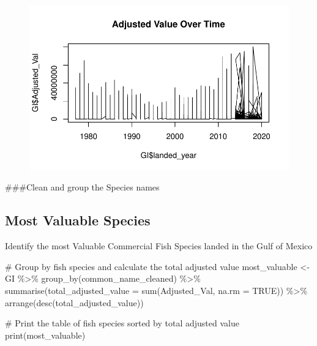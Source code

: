 \documentclass[
  letterpaper,
  DIV=11,
  numbers=noendperiod]{scrartcl}
\newenvironment{Shaded}{\begin{snugshade}}{\end{snugshade}}
\newcommand{\AttributeTok}[1]{\textcolor[rgb]{0.40,0.45,0.13}{#1}}
\newcommand{\CommentTok}[1]{\textcolor[rgb]{0.37,0.37,0.37}{#1}}
\newcommand{\ConstantTok}[1]{\textcolor[rgb]{0.56,0.35,0.01}{#1}}
\newcommand{\FunctionTok}[1]{\textcolor[rgb]{0.28,0.35,0.67}{#1}}
\newcommand{\NormalTok}[1]{\textcolor[rgb]{0.00,0.23,0.31}{#1}}
\newcommand{\OtherTok}[1]{\textcolor[rgb]{0.00,0.23,0.31}{#1}}
\newcommand{\SpecialCharTok}[1]{\textcolor[rgb]{0.37,0.37,0.37}{#1}}
\begin{document}
\begin{figure}[H]

{\centering \includegraphics{CV_Communities2_files/figure-pdf/unnamed-chunk-2-1.pdf}

}

\end{figure}

\#\#\#Clean and group the Species names

\hypertarget{most-valuable-species}{%
\subsection{Most Valuable Species}\label{most-valuable-species}}

Identify the most Valuable Commercial Fish Species landed in the Gulf of
Mexico

\begin{Shaded}
\begin{Highlighting}[]
\CommentTok{\# Group by fish species and calculate the total adjusted value}
\NormalTok{most\_valuable }\OtherTok{\textless{}{-}}\NormalTok{ GI }\SpecialCharTok{\%\textgreater{}\%}
  \FunctionTok{group\_by}\NormalTok{(common\_name\_cleaned) }\SpecialCharTok{\%\textgreater{}\%}
  \FunctionTok{summarise}\NormalTok{(}\AttributeTok{total\_adjusted\_value =} \FunctionTok{sum}\NormalTok{(Adjusted\_Val, }\AttributeTok{na.rm =} \ConstantTok{TRUE}\NormalTok{)) }\SpecialCharTok{\%\textgreater{}\%}
  \FunctionTok{arrange}\NormalTok{(}\FunctionTok{desc}\NormalTok{(total\_adjusted\_value))}

\CommentTok{\# Print the table of fish species sorted by total adjusted value}
\FunctionTok{print}\NormalTok{(most\_valuable)}
\end{Highlighting}
\end{Shaded}
\end{document}
